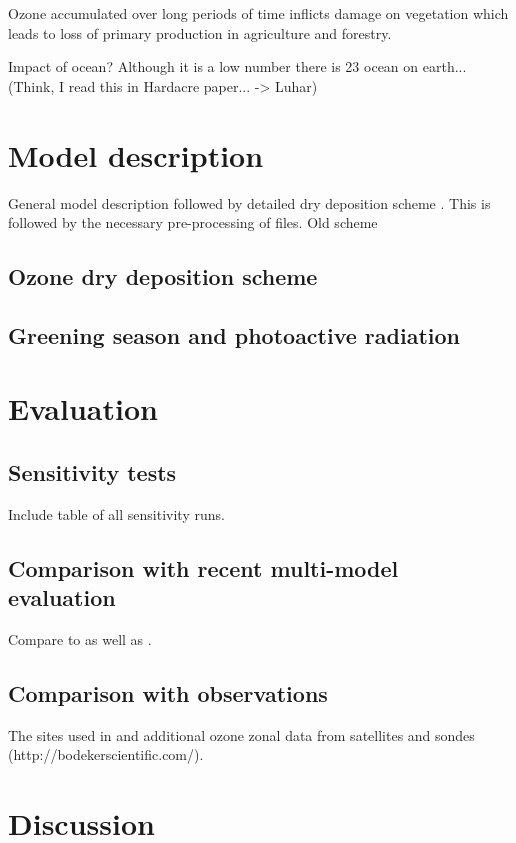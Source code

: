 \documentclass[gmd, manuscript]{copernicus}
\begin{document}
Ozone accumulated over long periods of time inflicts damage on vegetation which leads to loss of primary production in agriculture and forestry.

Impact of ocean? Although it is a low number there is 2\/3 ocean on earth... (Think, I read this in Hardacre paper... -> Luhar)


\section{Model description}
General model description followed by detailed dry deposition scheme \citep{ACP:Simpson2012,ICP:MappingManual2017}. This is followed by the necessary pre-processing of files. Old scheme \citep{AE:Wesely1989, JGR:Hough1991}
\citet{GMD:Sovde2012,GMD:Lund2018}
\subsection{Ozone dry deposition scheme}
\citet{ACP:Simpson2012} \citet{ICP:MappingManual2017}
\subsection{Greening season and photoactive radiation}

\section{Evaluation}

\subsection{Sensitivity tests}
Include table of all sensitivity runs.

\subsection{Comparison with recent multi-model evaluation}
Compare to \citet{ACP:Hardacre2015} as well as \citet{ACP:Luhar2017}.

\subsection{Comparison with observations}
The sites used in \citet{ACP:Hardacre2015} and additional ozone zonal data from satellites and sondes (http://bodekerscientific.com/).

\section{Discussion}
\end{document}
